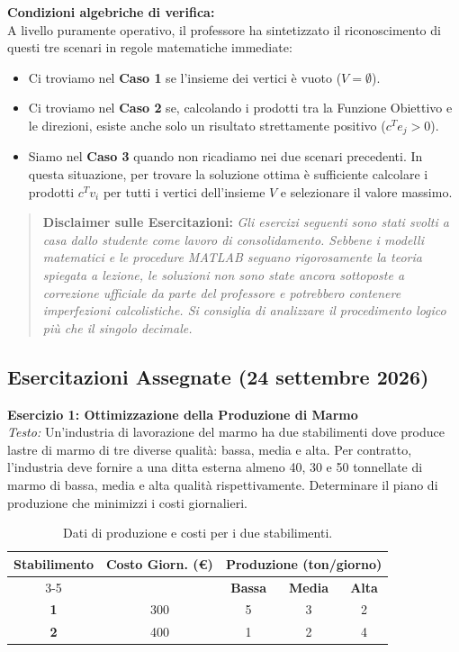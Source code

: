 \documentclass[12pt, a4paper]{article}
\renewcommand{\arraystretch}{1.25}
\begin{document}
	\textbf{Condizioni algebriche di verifica:}\\
	A livello puramente operativo, il professore ha sintetizzato il riconoscimento di questi tre scenari in regole matematiche immediate:
	\begin{itemize}
		\item Ci troviamo nel \textbf{Caso 1} se l'insieme dei vertici è vuoto ($V = \emptyset$).
		\item Ci troviamo nel \textbf{Caso 2} se, calcolando i prodotti tra la Funzione Obiettivo e le direzioni, esiste anche solo un risultato strettamente positivo ($c^T e_j > 0$).
		\item Siamo nel \textbf{Caso 3} quando non ricadiamo nei due scenari precedenti. In questa situazione, per trovare la soluzione ottima è sufficiente calcolare i prodotti $c^T v_i$ per tutti i vertici dell'insieme $V$ e selezionare il valore massimo.
	\end{itemize}
	
	\vspace{0.8cm}
	\begin{quote}
		\textbf{Disclaimer sulle Esercitazioni:} \textit{Gli esercizi seguenti sono stati svolti a casa dallo studente come lavoro di consolidamento. Sebbene i modelli matematici e le procedure MATLAB seguano rigorosamente la teoria spiegata a lezione, le soluzioni non sono state ancora sottoposte a correzione ufficiale da parte del professore e potrebbero contenere imperfezioni calcolistiche. Si consiglia di analizzare il procedimento logico più che il singolo decimale.}
	\end{quote}
	\vspace{0.4cm}
	
	\subsection*{Esercitazioni Assegnate (24 settembre 2026)}
	
	\textbf{Esercizio 1: Ottimizzazione della Produzione di Marmo}\\
	\textit{Testo:} Un'industria di lavorazione del marmo ha due stabilimenti dove produce lastre di marmo di tre diverse qualità: bassa, media e alta. Per contratto, l'industria deve fornire a una ditta esterna almeno 40, 30 e 50 tonnellate di marmo di bassa, media e alta qualità rispettivamente. Determinare il piano di produzione che minimizzi i costi giornalieri.
	
	\begin{table}[H]
		\centering
		\renewcommand{\arraystretch}{1.3}
		\begin{tabular}{|c|c|c|c|c|}
			\hline
			\multirow{2}{*}{\textbf{Stabilimento}} & \multirow{2}{*}{\textbf{Costo Giorn. (€)}} & \multicolumn{3}{c|}{\textbf{Produzione (ton/giorno)}} \\ \cline{3-5} 
			& & \textbf{Bassa} & \textbf{Media} & \textbf{Alta} \\ \hline
			\textbf{1} & 300 & 5 & 3 & 2 \\ \hline
			\textbf{2} & 400 & 1 & 2 & 4 \\ \hline
		\end{tabular}
		\caption{Dati di produzione e costi per i due stabilimenti.}
	\end{table}
	
\end{document}

